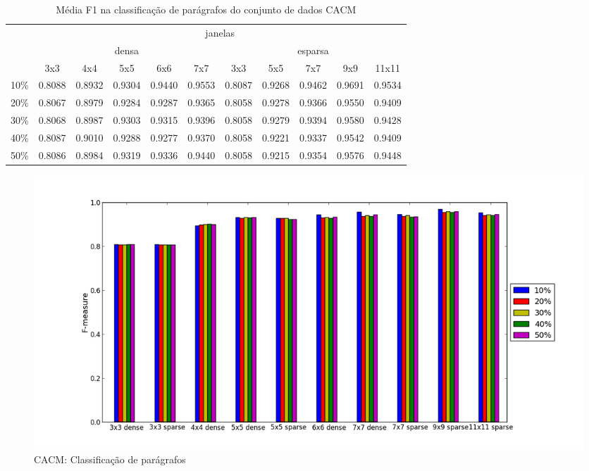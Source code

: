 \documentclass[a4paper,11pt]{article}
\begin{document}
  \begin{center}
    \begin{table}[p]
      \caption{Média F1 na classificação de parágrafos do conjunto de dados CACM}
      \begin{tabular}{ l | c c c c c || c c c c c | }
        \cline{2-11}
        & \multicolumn{10}{|c|}{janelas} \\
        \cline{2-11}
        & \multicolumn{5}{c||}{densa} & \multicolumn{5}{c|}{esparsa} \\
        \cline{2-11}
        & 3x3 & 4x4 & 5x5 & 6x6 & 7x7 & 3x3 & 5x5 & 7x7 & 9x9 & 11x11 \\
        \hline
        \multicolumn{1}{|l|}{10\%}& 0.8088& 0.8932& 0.9304& 0.9440& 0.9553& 0.8087& 0.9268& 0.9462& 0.9691& 0.9534\\
        \multicolumn{1}{|l|}{20\%}& 0.8067& 0.8979& 0.9284& 0.9287& 0.9365& 0.8058& 0.9278& 0.9366& 0.9550& 0.9409\\
        \multicolumn{1}{|l|}{30\%}& 0.8068& 0.8987& 0.9303& 0.9315& 0.9396& 0.8058& 0.9279& 0.9394& 0.9580& 0.9428\\
        \multicolumn{1}{|l|}{40\%}& 0.8087& 0.9010& 0.9288& 0.9277& 0.9370& 0.8058& 0.9221& 0.9337& 0.9542& 0.9409\\
        \multicolumn{1}{|l|}{50\%}& 0.8086& 0.8984& 0.9319& 0.9336& 0.9440& 0.8058& 0.9215& 0.9354& 0.9576& 0.9448\\
        \hline  
      \end{tabular}
    \end{table}
  \end{center}

  \begin{figure}[p]
    \centerline{\includegraphics[width=1.2\textwidth]{assets/experiment_charts/cacm_TextRegion_paragraph_f1.png}}
    \caption{CACM: Classificação de parágrafos}
    \label{fig:cacm_TextRegion_paragraph_f1}
  \end{figure}
\end{document}
